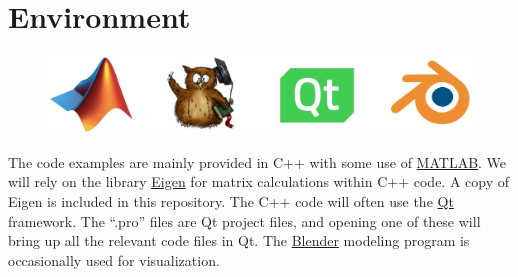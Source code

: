 \documentclass[12pt]{article}
\begin{document}
\section{Environment}
\begin{figure}[h]
	\centering
		\includegraphics[width=1.00\textwidth]{fig/logos.jpg}
	\label{fig:logos}
\end{figure}
\noindent The code examples are mainly provided in C++ with some use of \href{https://www.mathworks.com/}{MATLAB}. We will rely on the library \href{http://eigen.tuxfamily.org/}{Eigen} for matrix calculations within C++ code. A copy of Eigen is included in this repository. The C++ code will often use the \href{https://www.qt.io/}{Qt} framework. The ``.pro'' files are Qt project files, and opening one of these will bring up all the relevant code files in Qt. The \href{https://www.blender.org/}{Blender} modeling program is occasionally used for visualization.
\end{document}
